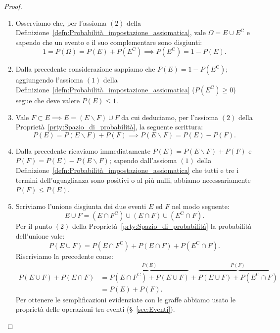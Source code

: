         \begin{proof}
            \hfill
            \begin{enumerate}
                \item Osserviamo che, per l'assioma $(2)$ della Definizione~\ref{defn:Probabilità_impostazione_assiomatica}, vale $\Omega = E \cup E^{\text{C}}$ e sapendo che un evento e il suo complementare sono disgiunti: \[
                    1 = P(\Omega)= P(E) + P(E^{\text{C}}) \implies P(E^{\text{C}}) = 1 - P(E)
                .\] 
                \item Dalla precedente considerazione sappiamo che $P(E) = 1 - P(E^{\text{C}})$; aggiungendo l'assioma $(1)$ della Definizione~\ref{defn:Probabilità_impostazione_assiomatica} ($P(E^{\text{C}}) \geq 0$) segue che deve valere $P(E) \leq 1$.
                \item Vale $F \subset E \implies E = (E \backslash F) \cup F$ da cui deduciamo, per l'assioma $(2)$ della Proprietà~\ref{prty:Spazio_di_probabilità}, la seguente scrittura: \[
                    P(E) = P(E \backslash F) + P(F) \implies P(E \backslash F) = P(E) - P(F)
                .\] 
                \item Dalla precedente ricaviamo immediatamente $P(E) = P(E \backslash F) + P(F)$ e  $P(F) = P(E) - P(E \backslash F)$; sapendo dall'assioma $(1)$ della Definizione~\ref{defn:Probabilità_impostazione_assiomatica} che tutti e tre i termini dell'uguaglianza sono positivi o al più nulli, abbiamo necessariamente $P(F) \leq P(E)$.
                \item Scriviamo l'unione disgiunta dei due eventi $E$ ed  $F$ nel modo seguente:  \[
                    E \cup F = (E \cap F^{\text{C}}) \cup (E \cap F) \cup (E^{\text{C}} \cap F)
                .\] Per il punto $(2)$ della Proprietà~\ref{prty:Spazio_di_probabilità} la probabilità dell'unione vale: \[
                    P(E \cup F) = P(E \cap F^{\text{C}}) + P(E \cap F) + P(E^{\text{C}} \cap F)
                .\] Riscriviamo la precedente come:
                \begin{align*}
                    P(E \cup F) + P(E \cap F) &= \overset{P(E)}{\overbrace{P(E \cap F^{\text{C}}) + P(E \cup F)}} + \overset{P(F)}{\overbrace{P(E \cup F) + P(E^{\text{C}} \cap F)}} \\ {}&= P(E) + P(F)
                .
                \end{align*}
                Per ottenere le semplificazioni evidenziate con le graffe abbiamo usato le proprietà delle operazioni tra eventi (§~\ref{sec:Eventi}). \qedhere
            \end{enumerate}
        \end{proof}
